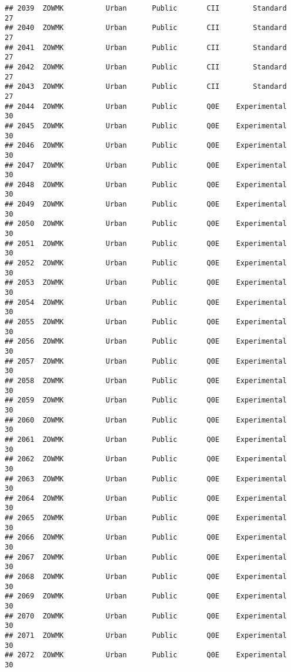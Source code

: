 \documentclass[
]{article}
\begin{document}
\begin{verbatim}
## 2039  ZOWMK          Urban      Public       CII        Standard        27
## 2040  ZOWMK          Urban      Public       CII        Standard        27
## 2041  ZOWMK          Urban      Public       CII        Standard        27
## 2042  ZOWMK          Urban      Public       CII        Standard        27
## 2043  ZOWMK          Urban      Public       CII        Standard        27
## 2044  ZOWMK          Urban      Public       Q0E    Experimental        30
## 2045  ZOWMK          Urban      Public       Q0E    Experimental        30
## 2046  ZOWMK          Urban      Public       Q0E    Experimental        30
## 2047  ZOWMK          Urban      Public       Q0E    Experimental        30
## 2048  ZOWMK          Urban      Public       Q0E    Experimental        30
## 2049  ZOWMK          Urban      Public       Q0E    Experimental        30
## 2050  ZOWMK          Urban      Public       Q0E    Experimental        30
## 2051  ZOWMK          Urban      Public       Q0E    Experimental        30
## 2052  ZOWMK          Urban      Public       Q0E    Experimental        30
## 2053  ZOWMK          Urban      Public       Q0E    Experimental        30
## 2054  ZOWMK          Urban      Public       Q0E    Experimental        30
## 2055  ZOWMK          Urban      Public       Q0E    Experimental        30
## 2056  ZOWMK          Urban      Public       Q0E    Experimental        30
## 2057  ZOWMK          Urban      Public       Q0E    Experimental        30
## 2058  ZOWMK          Urban      Public       Q0E    Experimental        30
## 2059  ZOWMK          Urban      Public       Q0E    Experimental        30
## 2060  ZOWMK          Urban      Public       Q0E    Experimental        30
## 2061  ZOWMK          Urban      Public       Q0E    Experimental        30
## 2062  ZOWMK          Urban      Public       Q0E    Experimental        30
## 2063  ZOWMK          Urban      Public       Q0E    Experimental        30
## 2064  ZOWMK          Urban      Public       Q0E    Experimental        30
## 2065  ZOWMK          Urban      Public       Q0E    Experimental        30
## 2066  ZOWMK          Urban      Public       Q0E    Experimental        30
## 2067  ZOWMK          Urban      Public       Q0E    Experimental        30
## 2068  ZOWMK          Urban      Public       Q0E    Experimental        30
## 2069  ZOWMK          Urban      Public       Q0E    Experimental        30
## 2070  ZOWMK          Urban      Public       Q0E    Experimental        30
## 2071  ZOWMK          Urban      Public       Q0E    Experimental        30
## 2072  ZOWMK          Urban      Public       Q0E    Experimental        30

\end{verbatim}
\end{document}
